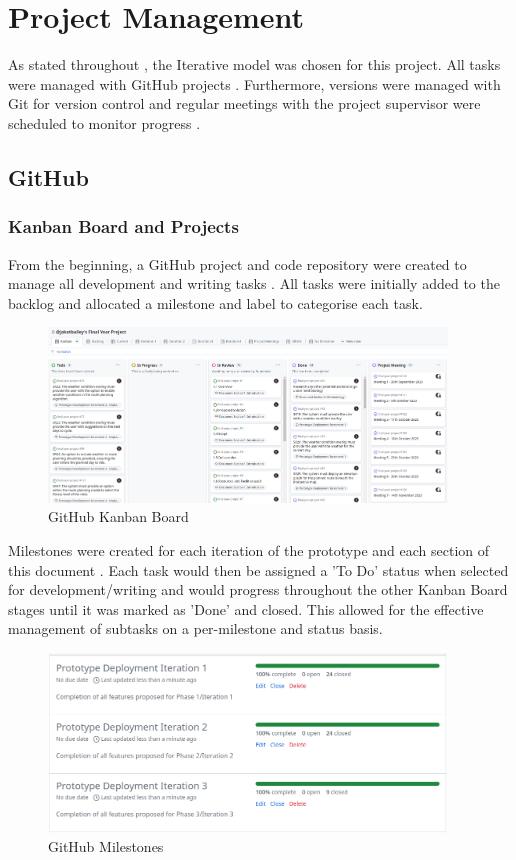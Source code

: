 \chapter{Project Management}
\label{chap:pm}

As stated throughout , the Iterative model was chosen for this project. All tasks were managed with GitHub projects . Furthermore, versions were managed with Git for version control  and regular meetings with the project supervisor were scheduled to monitor progress .

\section{GitHub}

\subsection{Kanban Board and Projects}
\label{pm:kanban}

From the beginning, a GitHub project and code repository were created to manage all development and writing tasks . All tasks were initially added to the backlog and allocated a milestone and label to categorise each task.

\begin{figure}
    \centering
    \includegraphics[width=400px]{figures/kanban.png}
    \caption{GitHub Kanban Board}
    \label{fig:kanban}
\end{figure}

Milestones were created for each iteration of the prototype and each section of this document . Each task would then be assigned a 'To Do' status when selected for development/writing and would progress throughout the other Kanban Board stages until it was marked as 'Done' and closed. This allowed for the effective management of subtasks on a per-milestone and status basis.

\begin{figure}
    \centering
    \includegraphics[width=400px]{figures/milestones.png}
    \caption{GitHub Milestones}
    \label{fig:milestones}
\end{figure}

